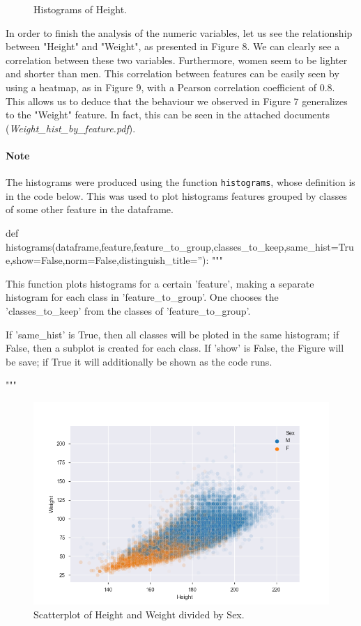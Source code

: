\documentclass[11pt]{article} %
\begin{document}
\begin{figure}
\begin{subfigure}{.5\textwidth}
    \end{subfigure}
    \caption{Histograms of Height.}
\end{figure}

In order to finish the analysis of the numeric variables, let us see the relationship between "Height" and "Weight", as presented in Figure 8. We can clearly see a correlation between these two variables. Furthermore, women seem to be lighter and shorter than men. This correlation between features can be easily seen by using a heatmap, as in Figure 9, with a Pearson correlation coefficient of 0.8. This allows us to deduce that the behaviour we observed in Figure 7 generalizes to the "Weight" feature. In fact, this can be seen in the attached documents ({\it Weight\_hist\_by\_feature.pdf}).

\paragraph{Note} The histograms were produced using the function {\tt histograms}, whose definition is in the code below. This was used to plot histograms features grouped by classes of some other feature in the dataframe.

\begin{python}
def histograms(dataframe,feature,feature_to_group,classes_to_keep,same_hist=True,show=False,norm=False,distinguish_title=''):
    """

    This function plots histograms for a certain 'feature', making a separate histogram for each class in
    'feature_to_group'. One chooses the 'classes_to_keep' from the classes of 'feature_to_group'.

    If 'same_hist' is True, then all classes will be ploted in the same histogram; if False, then a subplot is created for each class.
    If 'show' is False, the Figure will be save; if True it will additionally be shown as the code runs.

    """
\end{python}

\begin{figure}
    \centering
    \includegraphics[scale=0.8]{Scatter_Height_Weight.png}
    \caption{Scatterplot of Height and Weight divided by Sex.}
\end{figure}
\end{document}
